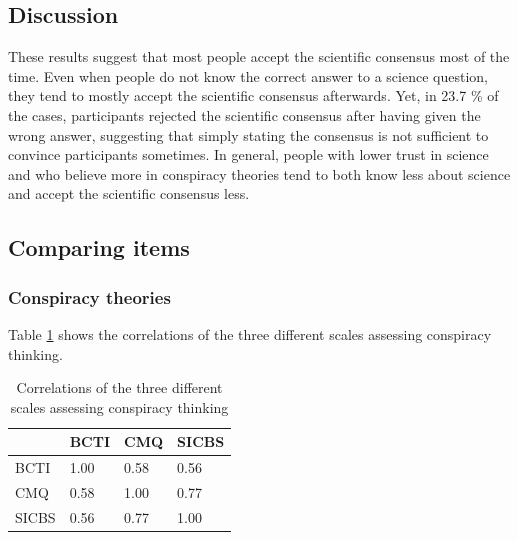 \documentclass[
  doc,floatsintext]{apa6}
\begin{document}
\subsection{Discussion}\label{discussion-1}

These results suggest that most people accept the scientific consensus most of the time. Even when people do not know the correct answer to a science question, they tend to mostly accept the scientific consensus afterwards. Yet, in 23.7 \% of the cases, participants rejected the scientific consensus after having given the wrong answer, suggesting that simply stating the consensus is not sufficient to convince participants sometimes. In general, people with lower trust in science and who believe more in conspiracy theories tend to both know less about science and accept the scientific consensus less.

\subsection{Comparing items}\label{comparing-items}

\subsubsection{Conspiracy theories}\label{conspiracy-theories}

Table \ref{tab:correlation-conspiracy} shows the correlations of the three different scales assessing conspiracy thinking.

\begin{table}[h]

\begin{center}
\begin{threeparttable}

\caption{\label{tab:correlation-conspiracy}Correlations of the three different scales assessing conspiracy thinking}

\begin{tabular}{llll}
\toprule
 & \multicolumn{1}{c}{BCTI} & \multicolumn{1}{c}{CMQ} & \multicolumn{1}{c}{SICBS}\\
\midrule
BCTI & 1.00 & 0.58 & 0.56\\
CMQ & 0.58 & 1.00 & 0.77\\
SICBS & 0.56 & 0.77 & 1.00\\
\bottomrule
\end{tabular}

\end{threeparttable}
\end{center}

\end{table}
\end{document}
